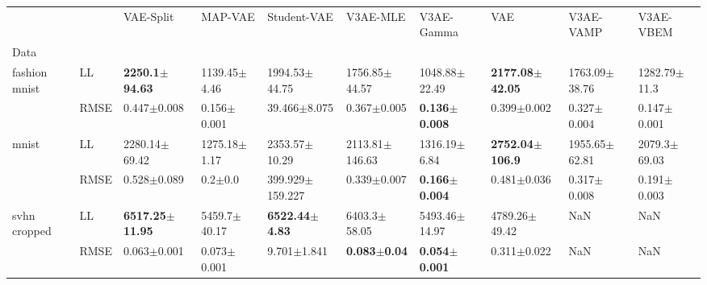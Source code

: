 \begin{tabular}{llllllllll}
\toprule
             &      &                   VAE-Split &           MAP-VAE &                Student-VAE &                 V3AE-MLE &                V3AE-Gamma &                         VAE &          V3AE-VAMP &         V3AE-VBEM \\
Data & {} &                             &                   &                            &                          &                           &                             &                    &                   \\
\midrule
fashion mnist & LL &   \textbf{2250.1$\pm$94.63} &  1139.45$\pm$4.46 &          1994.53$\pm$44.75 &        1756.85$\pm$44.57 &         1048.88$\pm$22.49 &  \textbf{2177.08$\pm$42.05} &  1763.09$\pm$38.76 &  1282.79$\pm$11.3 \\
             & RMSE &             0.447$\pm$0.008 &   0.156$\pm$0.001 &           39.466$\pm$8.075 &          0.367$\pm$0.005 &  \textbf{0.136$\pm$0.008} &             0.399$\pm$0.002 &    0.327$\pm$0.004 &   0.147$\pm$0.001 \\
mnist & LL &           2280.14$\pm$69.42 &  1275.18$\pm$1.17 &          2353.57$\pm$10.29 &       2113.81$\pm$146.63 &          1316.19$\pm$6.84 &  \textbf{2752.04$\pm$106.9} &  1955.65$\pm$62.81 &  2079.3$\pm$69.03 \\
             & RMSE &             0.528$\pm$0.089 &       0.2$\pm$0.0 &        399.929$\pm$159.227 &          0.339$\pm$0.007 &  \textbf{0.166$\pm$0.004} &             0.481$\pm$0.036 &    0.317$\pm$0.008 &   0.191$\pm$0.003 \\
svhn cropped & LL &  \textbf{6517.25$\pm$11.95} &  5459.7$\pm$40.17 &  \textbf{6522.44$\pm$4.83} &         6403.3$\pm$58.05 &         5493.46$\pm$14.97 &           4789.26$\pm$49.42 &                NaN &               NaN \\
             & RMSE &             0.063$\pm$0.001 &   0.073$\pm$0.001 &            9.701$\pm$1.841 &  \textbf{0.083$\pm$0.04} &  \textbf{0.054$\pm$0.001} &             0.311$\pm$0.022 &                NaN &               NaN \\
\bottomrule
\end{tabular}

